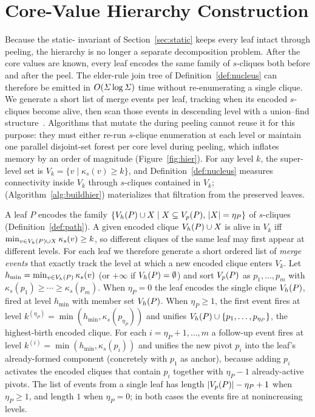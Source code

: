 \section{Core-Value Hierarchy Construction}\label{sec:buildhier}

Because the static-\cpi{} invariant of Section~\ref{sec:static} keeps every leaf intact through peeling, the hierarchy is no longer a separate decomposition problem.
%
After the core values are known, every \cpi{} leaf encodes the same family of $s$-cliques both before and after the peel.
%
The elder-rule join tree of Definition~\ref{def:nucleus} can therefore be emitted in $O(\varSigma\log\varSigma)$ time without re-enumerating a single clique.
%
We generate a short list of merge events per leaf, tracking when its encoded $s$-cliques become alive, then scan those events in descending level with a union--find structure~\cite{TarjanUnionFind}.
%
Algorithms that mutate the \cpi{} during peeling cannot reuse it for this purpose: they must either re-run $s$-clique enumeration at each level or maintain one parallel disjoint-set forest per core level during peeling, which inflates memory by an order of magnitude (Figure~\ref{fig:hier}).
%
For any level $k$, the super-level set is $V_k=\{v\mid \kappa_s(v)\!\ge\!k\}$, and Definition~\ref{def:nucleus} measures connectivity inside $V_k$ through $s$-cliques contained in $V_k$; \buildHier{} (Algorithm~\ref{alg:buildhier}) materializes that filtration from the preserved leaves.

A \cpi{} leaf $P$ encodes the family $\{V_h(P)\cup X\mid X\subseteq V_p(P),\,|X|=\eta_P\}$ of $s$-cliques (Definition~\ref{def:path}).
%
A given encoded clique $V_h(P)\cup X$ is alive in $V_k$ iff $\min_{v\in V_h(P)\cup X}\kappa_s(v)\ge k$, so different cliques of the same leaf may first appear at different levels.
%
For each leaf we therefore generate a short ordered list of \emph{merge events} that exactly track the level at which a new encoded clique enters $V_k$.
%
Let $h_{\min}=\min_{v\in V_h(P)}\kappa_s(v)$ (or $+\infty$ if $V_h(P)=\emptyset$) and sort $V_p(P)$ as $p_1,\ldots,p_m$ with $\kappa_s(p_1)\ge\cdots\ge\kappa_s(p_m)$.
%
When $\eta_P=0$ the leaf encodes the single clique $V_h(P)$, fired at level $h_{\min}$ with member set $V_h(P)$.
%
When $\eta_P\!\ge\!1$, the first event fires at level $k^{(\eta_P)}=\min(h_{\min},\kappa_s(p_{\eta_P}))$ and unifies $V_h(P)\cup\{p_1,\ldots,p_{\eta_P}\}$, the highest-birth encoded clique.
%
For each $i=\eta_P+1,\ldots,m$ a follow-up event fires at level $k^{(i)}=\min(h_{\min},\kappa_s(p_i))$ and unifies the new pivot $p_i$ into the leaf's already-formed component (concretely with $p_1$ as anchor), because adding $p_i$ activates the encoded cliques that contain $p_i$ together with $\eta_P\!-\!1$ already-active pivots.
%
The list of events from a single leaf has length $|V_p(P)|-\eta_P+1$ when $\eta_P\!\ge\!1$, and length $1$ when $\eta_P\!=\!0$; in both cases the events fire at nonincreasing levels.

